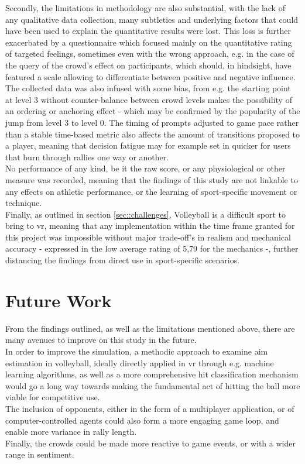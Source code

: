 Secondly, the limitations in methodology are also substantial, with the lack of any qualitative data collection, many subtleties and underlying factors that could have been used to explain the quantitative results were lost. This loss is further exacerbated by a questionnaire which focused mainly on the quantitative rating of targeted feelings, sometimes even with the wrong approach, e.g. in the case of the query of the crowd's effect on participants, which should, in hindsight, have featured a scale allowing to differentiate between positive and negative influence.\\

The collected data was also infused with some bias, from e.g. the starting point at level 3 without counter-balance between crowd levels makes the possibility of an ordering or anchoring effect - which may be confirmed by the popularity of the jump from level 3 to level 0. The timing of prompts adjusted to game pace rather than a stable time-based metric also affects the amount of transitions proposed to a player, meaning that decision fatigue may for example set in quicker for users that burn through rallies one way or another.\\
No performance of any kind, be it the raw score, or any physiological or other measure was recorded, meaning that the findings of this study are not linkable to any effects on athletic performance, or the learning of sport-specific movement or technique.\\

Finally, as outlined in section \ref{sec::challenges}, Volleyball is a difficult sport to bring to \gls{vr}, meaning that any implementation within the time frame granted for this project was impossible without major trade-off's in realism and mechanical accuracy - expressed in the low average rating of 5,79 for the mechanics -, further distancing the findings from direct use in sport-specific scenarios.

\section{Future Work}

From the findings outlined, as well as the limitations mentioned above, there are many avenues to improve on this study in the future.\\

In order to improve the simulation, a methodic approach to examine aim estimation in volleyball, ideally directly applied in \gls{vr} through e.g. machine learning algorithms, as well as a more comprehensive hit classification mechanism would go a long way towards making the fundamental act of hitting the ball more viable for competitive use.\\
The inclusion of opponents, either in the form of a multiplayer application, or of computer-controlled agents could also form a more engaging game loop, and enable more variance in rally length.\\
Finally, the crowds could be made more reactive to game events, or with a wider range in sentiment.\\

